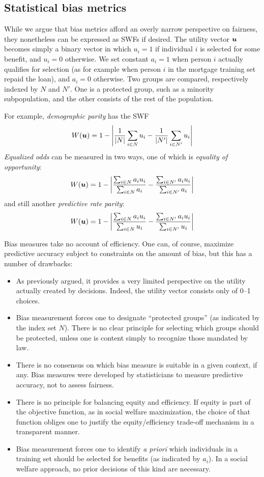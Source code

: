 \documentclass{article}[11pt]
\begin{document}
\subsection{Statistical bias metrics}

While we argue that bias metrics afford an overly narrow perspective on fairness, they nonetheless can be expressed as SWFs if desired.  The utility vector $\bm{u}$ becomes simply a binary vector in which $u_i=1$ if individual $i$ is selected for some benefit, and $u_i=0$ otherwise.  We set constant $a_i=1$ when person $i$ actually qualifies for selection (as for example when person $i$ in the mortgage training set repaid the loan), and $a_i=0$ otherwise.  Two groups are compared, respectively indexed by $N$ and $N'$.  One is a protected group, such as a minority subpopulation, and the other consists of the rest of the population.  

For example, {\em demographic parity} has the SWF
\[
W(\bm{u}) = 1 - \left|
\frac{1}{|N|}\sum_{i\in N} u_i - \frac{1}{|N'|} \sum_{i\in N'} u_i
\right|
\]
{\em Equalized odds} can be measured in two ways, one of which is {\em equality of opportunity}:
\[
W(\bm{u}) = 1 - \left|
\frac{\sum_{i\in N} a_iu_i}{\sum_{i\in N} a_i}
- \frac{\sum_{i\in N'} a_iu_i}{\sum_{i\in N'} a_i}
\right|
\]
and still another {\em predictive rate parity}:
\[
W(\bm{u}) = 1 - \left|
\frac{\sum_{i\in N} a_iu_i}{\sum_{i\in N} u_i} -
\frac{\sum_{i\in N'} a_iu_i}{\sum_{i\in N'} u_i} 
\right|
\]

Bias measures take no account of efficiency.  One can, of course, maximize predictive accuracy subject to constraints on the amount of bias, but this has a number of drawbacks:

\begin{itemize}
    \item As previously argued, it provides a very limited perspective on the utility actually created by decisions.  Indeed, the utility vector consists only of 0--1 choices.
    \item Bias measurement forces one to designate ``protected groups'' (as indicated by the index set $N$).  There is no clear principle for selecting which groups should be protected, unless one is content simply to recognize those mandated by law. 
    \item There is no consensus on which bias measure is suitable in a given context, if any.  Bias measures were developed by statisticians to measure predictive accuracy, not to assess fairness.
    \item There is no principle for balancing equity and efficiency.  If equity is part of the objective function, as in social welfare maximization, the choice of that function obliges one to justify the equity/efficiency trade-off mechanism in a transparent manner.  
    \item Bias measurement forces one to identify {\em a priori} which individuals in a training set should be selected for benefits (as indicated by $a_i$).  In a social welfare approach, no prior decisions of this kind are necessary.   
\end{itemize}
\end{document}
